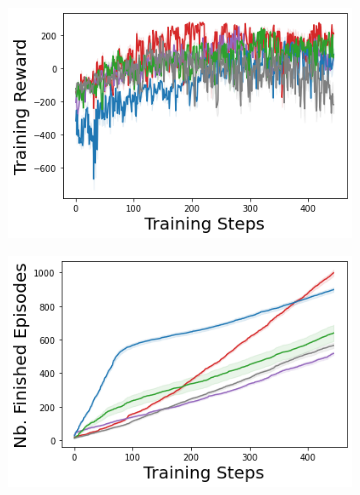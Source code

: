 \begin{figure}
\begin{subfigure}{.3\textwidth}
    \end{subfigure}
    \vspace{-3mm}
    \caption*{CartPole}
    \vspace{2mm}
    
    \begin{subfigure}{.3\textwidth}
        \includegraphics[width=\textwidth]{sections/011_icml2022/resources/lunarlander-training_total_reward-training-model+.png}
    \end{subfigure}
    \begin{subfigure}{.3\textwidth}
        \includegraphics[width=\textwidth]{sections/011_icml2022/resources/lunarlander-n_finished_training_episodes-training-model+.png}
    \end{subfigure}
    \begin{subfigure}{.3\textwidth}

\end{subfigure}
\end{figure}
